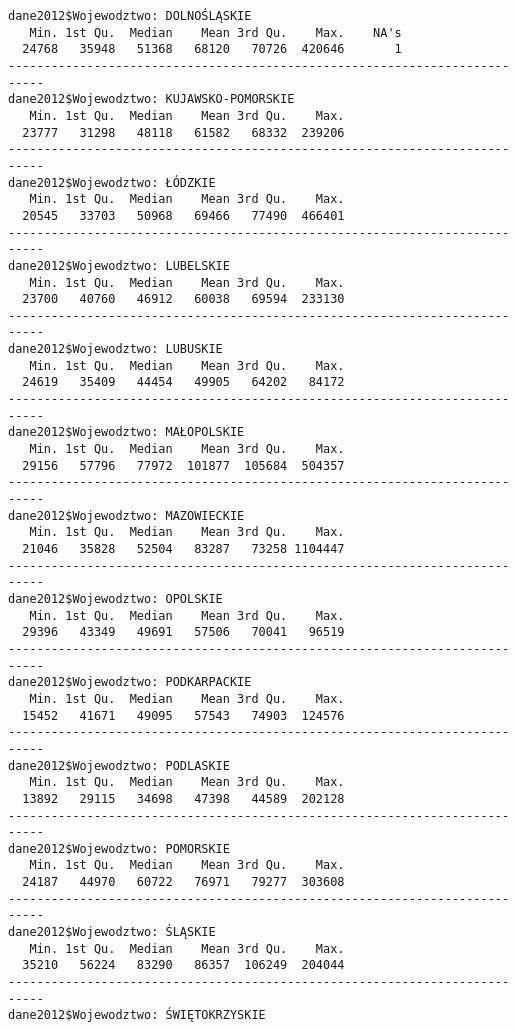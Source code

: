 \begin{verbatim}
dane2012$Wojewodztwo: DOLNOŚLĄSKIE
   Min. 1st Qu.  Median    Mean 3rd Qu.    Max.    NA's 
  24768   35948   51368   68120   70726  420646       1 
--------------------------------------------------------------------------- 
dane2012$Wojewodztwo: KUJAWSKO-POMORSKIE
   Min. 1st Qu.  Median    Mean 3rd Qu.    Max. 
  23777   31298   48118   61582   68332  239206 
--------------------------------------------------------------------------- 
dane2012$Wojewodztwo: ŁÓDZKIE
   Min. 1st Qu.  Median    Mean 3rd Qu.    Max. 
  20545   33703   50968   69466   77490  466401 
--------------------------------------------------------------------------- 
dane2012$Wojewodztwo: LUBELSKIE
   Min. 1st Qu.  Median    Mean 3rd Qu.    Max. 
  23700   40760   46912   60038   69594  233130 
--------------------------------------------------------------------------- 
dane2012$Wojewodztwo: LUBUSKIE
   Min. 1st Qu.  Median    Mean 3rd Qu.    Max. 
  24619   35409   44454   49905   64202   84172 
--------------------------------------------------------------------------- 
dane2012$Wojewodztwo: MAŁOPOLSKIE
   Min. 1st Qu.  Median    Mean 3rd Qu.    Max. 
  29156   57796   77972  101877  105684  504357 
--------------------------------------------------------------------------- 
dane2012$Wojewodztwo: MAZOWIECKIE
   Min. 1st Qu.  Median    Mean 3rd Qu.    Max. 
  21046   35828   52504   83287   73258 1104447 
--------------------------------------------------------------------------- 
dane2012$Wojewodztwo: OPOLSKIE
   Min. 1st Qu.  Median    Mean 3rd Qu.    Max. 
  29396   43349   49691   57506   70041   96519 
--------------------------------------------------------------------------- 
dane2012$Wojewodztwo: PODKARPACKIE
   Min. 1st Qu.  Median    Mean 3rd Qu.    Max. 
  15452   41671   49095   57543   74903  124576 
--------------------------------------------------------------------------- 
dane2012$Wojewodztwo: PODLASKIE
   Min. 1st Qu.  Median    Mean 3rd Qu.    Max. 
  13892   29115   34698   47398   44589  202128 
--------------------------------------------------------------------------- 
dane2012$Wojewodztwo: POMORSKIE
   Min. 1st Qu.  Median    Mean 3rd Qu.    Max. 
  24187   44970   60722   76971   79277  303608 
--------------------------------------------------------------------------- 
dane2012$Wojewodztwo: ŚLĄSKIE
   Min. 1st Qu.  Median    Mean 3rd Qu.    Max. 
  35210   56224   83290   86357  106249  204044 
--------------------------------------------------------------------------- 
dane2012$Wojewodztwo: ŚWIĘTOKRZYSKIE

\end{verbatim}
